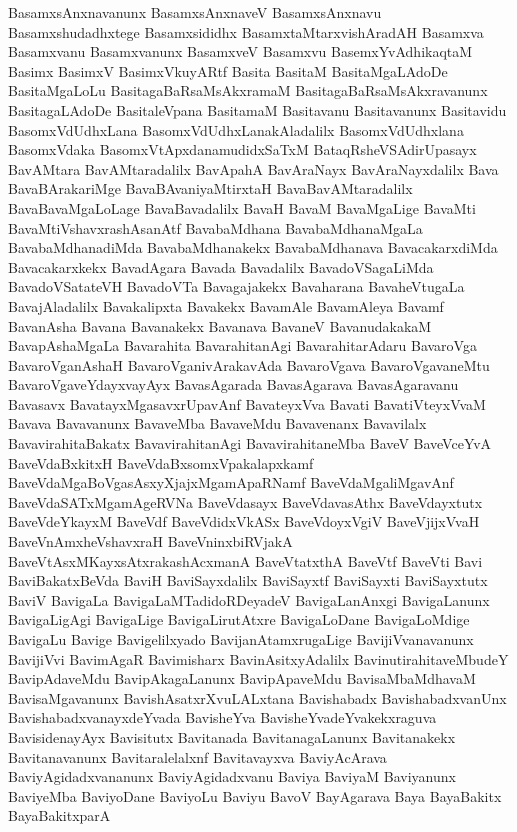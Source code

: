 {BasamxsAnxnavanunx
BasamxsAnxnaveV
BasamxsAnxnavu
Basamxshudadhxtege
Basamxsididhx
BasamxtaMtarxvishAradAH
Basamxva
Basamxvanu
Basamxvanunx
BasamxveV
Basamxvu
BasemxYvAdhikaqtaM
Basimx
BasimxV
BasimxVkuyARtf
Basita
BasitaM
BasitaMgaLAdoDe
BasitaMgaLoLu
BasitagaBaRsaMsAkxramaM
BasitagaBaRsaMsAkxravanunx
BasitagaLAdoDe
BasitaleVpana
BasitamaM
Basitavanu
Basitavanunx
Basitavidu
BasomxVdUdhxLana
BasomxVdUdhxLanakAladalilx
BasomxVdUdhxlana
BasomxVdaka
BasomxVtApxdanamudidxSaTxM
BataqRsheVSAdirUpasayx
BavAMtara
BavAMtaradalilx
BavApahA
BavAraNayx
BavAraNayxdalilx
Bava
BavaBArakariMge
BavaBAvaniyaMtirxtaH
BavaBavAMtaradalilx
BavaBavaMgaLoLage
BavaBavadalilx
BavaH
BavaM
BavaMgaLige
BavaMti
BavaMtiVshavxrashAsanAtf
BavabaMdhana
BavabaMdhanaMgaLa
BavabaMdhanadiMda
BavabaMdhanakekx
BavabaMdhanava
BavacakarxdiMda
Bavacakarxkekx
BavadAgara
Bavada
Bavadalilx
BavadoVSagaLiMda
BavadoVSatateVH
BavadoVTa
Bavagajakekx
Bavaharana
BavaheVtugaLa
BavajAladalilx
Bavakalipxta
Bavakekx
BavamAle
BavamAleya
Bavamf
BavanAsha
Bavana
Bavanakekx
Bavanava
BavaneV
BavanudakakaM
BavapAshaMgaLa
Bavarahita
BavarahitanAgi
BavarahitarAdaru
BavaroVga
BavaroVganAshaH
BavaroVganivArakavAda
BavaroVgava
BavaroVgavaneMtu
BavaroVgaveYdayxvayAyx
BavasAgarada
BavasAgarava
BavasAgaravanu
Bavasavx
BavatayxMgasavxrUpavAnf
BavateyxVva
Bavati
BavatiVteyxVvaM
Bavava
Bavavanunx
BavaveMba
BavaveMdu
Bavavenanx
Bavavilalx
BavavirahitaBakatx
BavavirahitanAgi
BavavirahitaneMba
BaveV
BaveVceYvA
BaveVdaBxkitxH
BaveVdaBxsomxVpakalapxkamf
BaveVdaMgaBoVgasAsxyXjajxMgamApaRNamf
BaveVdaMgaliMgavAnf
BaveVdaSATxMgamAgeRVNa
BaveVdasayx
BaveVdavasAthx
BaveVdayxtutx
BaveVdeYkayxM
BaveVdf
BaveVdidxVkASx
BaveVdoyxVgiV
BaveVjijxVvaH
BaveVnAmxheVshavxraH
BaveVninxbiRVjakA
BaveVtAsxMKayxsAtxrakashAcxmanA
BaveVtatxthA
BaveVtf
BaveVti
Bavi
BaviBakatxBeVda
BaviH
BaviSayxdalilx
BaviSayxtf
BaviSayxti
BaviSayxtutx
BaviV
BavigaLa
BavigaLaMTadidoRDeyadeV
BavigaLanAnxgi
BavigaLanunx
BavigaLigAgi
BavigaLige
BavigaLirutAtxre
BavigaLoDane
BavigaLoMdige
BavigaLu
Bavige
Bavigelilxyado
BavijanAtamxrugaLige
BavijiVvanavanunx
BavijiVvi
BavimAgaR
Bavimisharx
BavinAsitxyAdalilx
BavinutirahitaveMbudeY
BavipAdaveMdu
BavipAkagaLanunx
BavipApaveMdu
BavisaMbaMdhavaM
BavisaMgavanunx
BavishAsatxrXvuLALxtana
Bavishabadx
BavishabadxvanUnx
BavishabadxvanayxdeYvada
BavisheYva
BavisheYvadeYvakekxraguva
BavisidenayAyx
Bavisitutx
Bavitanada
BavitanagaLanunx
Bavitanakekx
Bavitanavanunx
Bavitaralelalxnf
Bavitavayxva
BaviyAcArava
BaviyAgidadxvananunx
BaviyAgidadxvanu
Baviya
BaviyaM
Baviyanunx
BaviyeMba
BaviyoDane
BaviyoLu
Baviyu
BavoV
BayAgarava
Baya
BayaBakitx
BayaBakitxparA
}
